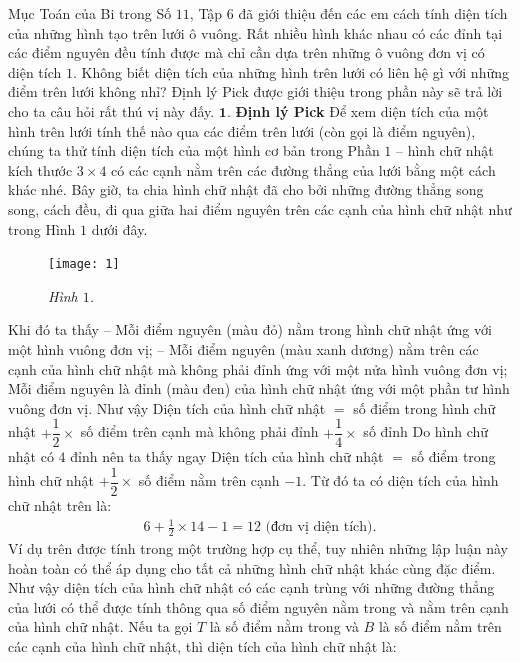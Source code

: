 \begin{multicols}{2}
	Mục Toán của Bi trong Số $11$, Tập $6$ đã giới thiệu đến các em cách tính diện tích của những hình tạo trên lưới ô vuông. Rất nhiều hình khác nhau có các đỉnh tại các điểm nguyên đều tính được mà chỉ cần dựa trên những ô vuông đơn vị có diện tích $1$. Không biết diện tích của những hình trên lưới có liên hệ gì với những điểm trên lưới không nhỉ? Định lý Pick được giới thiệu trong phần này sẽ trả lời cho ta câu hỏi rất thú vị này đấy.
	\vskip 0.1cm
	$\pmb{1.}$ \textbf{\color{toancuabi}Định lý Pick}
	\vskip 0.1cm
	Để xem diện tích của một hình trên lưới tính thế nào qua các điểm trên lưới (còn gọi là điểm nguyên), chúng ta thử tính diện tích của một hình cơ bản trong Phần $1$ -- hình chữ nhật kích thước $3\times4$ có các cạnh nằm trên các đường thẳng của lưới bằng một cách khác nhé. Bây giờ, ta chia hình chữ nhật đã cho bởi những đường thẳng song song, cách đều, đi qua giữa hai điểm nguyên trên các cạnh của hình chữ nhật như trong Hình $1$ dưới đây. 
	\begin{figure}[H]
		\vspace*{-5pt}
		\centering
		\captionsetup{labelformat= empty, justification=centering}
		\texttt{[image: 1]}
		\caption{\small\textit{\color{toancuabi}Hình $1$.}}
		\vspace*{-5pt}
	\end{figure}
	Khi đó ta thấy
	\vskip 0.1cm
	-- Mỗi điểm nguyên ({\color{red}màu đỏ}) nằm trong hình chữ nhật ứng với một hình vuông đơn vị;
	\vskip 0.1cm
	-- Mỗi điểm nguyên ({\color{blue}màu xanh dương}) nằm trên các cạnh của hình chữ nhật mà không phải đỉnh ứng với một nửa hình vuông đơn vị;
	\vskip 0.1cm
	Mỗi điểm nguyên là đỉnh ({\color{black}màu đen}) của hình chữ nhật ứng với một phần tư hình vuông đơn vị.
	\vskip 0.1cm
	Như vậy
	\vskip 0.1cm
	Diện tích của hình chữ nhật $=$ số điểm trong hình chữ nhật
	$+ \dfrac{1}{2}\times$ số điểm trên cạnh mà không phải đỉnh $+ \dfrac{1}{4}\times$ số đỉnh
	\vskip 0.1cm
	Do hình chữ nhật có $4$ đỉnh nên ta thấy ngay
	\vskip 0.1cm
	Diện tích của hình chữ nhật $=$ số điểm trong hình chữ nhật 
	$+ \dfrac{1}{2} \times$ số điểm nằm trên cạnh
	$- 1$.
	\vskip 0.1cm
	Từ đó ta có diện tích của hình chữ nhật trên là:
	\begin{align*}
		6 + \frac{1}{2}\times14 - 1 = 12 \text{ (đơn vị diện tích).}
	\end{align*}
	Ví dụ trên được tính trong một trường hợp cụ thể, tuy nhiên những lập luận này hoàn toàn có thể áp dụng cho tất cả những hình chữ nhật khác cùng đặc điểm. Như vậy diện tích của hình chữ nhật có các cạnh trùng với những đường thẳng của lưới có thể được tính thông qua số điểm nguyên nằm trong và nằm trên cạnh của hình chữ nhật. Nếu ta gọi $T$ là số điểm nằm trong và $B$ là số điểm nằm trên các cạnh của hình chữ nhật, thì diện tích của hình chữ nhật là:

\end{multicols}
